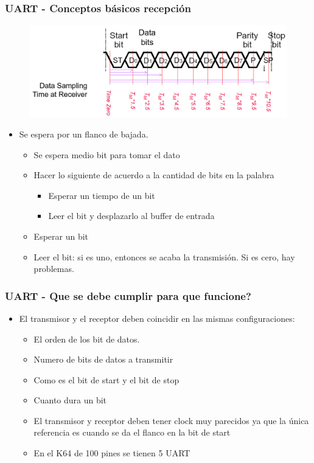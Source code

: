 \documentclass[10.5pt,scale=1.0,t,aspectratio=169,hyperref={pdfpagelabels=false}]{beamer}
\begin{document}
\begin{frame}
	\frametitle{UART - Conceptos básicos recepción}
	
	\begin{figure}
		\centering
		\includegraphics[scale=0.3]{35_UARTReceive}
	\end{figure}
	
	\begin{itemize}
		\item Se espera por un flanco de bajada.
		\begin{itemize}
			\item Se espera medio bit para tomar el dato
			\item Hacer lo siguiente de acuerdo a la cantidad de bits en la palabra
			\begin{itemize}
				\item Esperar un tiempo de un bit
				\item Leer el bit y desplazarlo al buffer de entrada
			\end{itemize}
			\item Esperar un bit
			\item Leer el bit: si es uno, entonces se acaba la transmisión. Si es cero, hay problemas. 
		\end{itemize}
	\end{itemize}
\end{frame}
\begin{frame}
	\frametitle{UART - Que se debe cumplir para que funcione?}
	\begin{itemize}
		\item El transmisor y el receptor deben coincidir en las mismas configuraciones:
		\begin{itemize}
			\item El orden de los bit de datos.
			\item Numero de bits de datos a transmitir
			\item Como es el bit de start y el bit de stop
			\item Cuanto dura un bit
			\item El transmisor y receptor deben tener clock muy parecidos ya que la única referencia es cuando se da el flanco en la bit de start
			\item En el K64 de 100 pines se tienen 5 UART
		\end{itemize}
	\end{itemize}
\end{frame}
\end{document}
